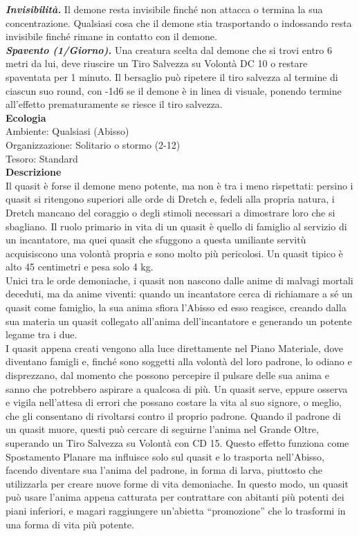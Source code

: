 \begin{multicols}{2}
\emph{\textbf{Invisibilità.}} Il demone resta invisibile finché non attacca o termina la sua concentrazione. Qualsiasi cosa che il demone stia trasportando o indossando resta invisibile finché rimane in contatto con il demone.\\
\emph{\textbf{Spavento (1/Giorno).}} Una creatura scelta dal demone che si trovi entro 6 metri da lui, deve riuscire un Tiro Salvezza su Volontà DC 10 o restare spaventata per 1 minuto. Il bersaglio può ripetere il tiro salvezza al termine di ciascun suo round, con -1d6 se il demone è in linea di visuale, ponendo termine all'effetto prematuramente se riesce il tiro salvezza.\\
\textbf{Ecologia}\\
Ambiente: Qualsiasi (Abisso)\\
Organizzazione: Solitario o stormo (2-12)\\
Tesoro: Standard\\
\textbf{Descrizione}\\
Il quasit è forse il demone meno potente, ma non è tra i meno rispettati: persino i quasit si ritengono superiori alle orde di Dretch e, fedeli alla propria natura, i Dretch mancano del coraggio o degli stimoli necessari a dimostrare loro che si sbagliano. Il ruolo primario in vita di un quasit è quello di famiglio al servizio di un incantatore, ma quei quasit che sfuggono a questa umiliante servitù acquisiscono una volontà propria e sono molto più pericolosi. Un quasit tipico è alto 45 centimetri e pesa solo 4 kg.\\
Unici tra le orde demoniache, i quasit non nascono dalle anime di malvagi mortali deceduti, ma da anime viventi: quando un incantatore cerca di richiamare a sé un quasit come famiglio, la sua anima sfiora l'Abisso ed esso reagisce, creando dalla sua materia un quasit collegato all'anima dell'incantatore e generando un potente legame tra i due.\\
I quasit appena creati vengono alla luce direttamente nel Piano Materiale, dove diventano famigli e, finché sono soggetti alla volontà del loro padrone, lo odiano e disprezzano, dal momento che possono percepire il pulsare delle sua anima e sanno che potrebbero aspirare a qualcosa di più. Un quasit serve, eppure osserva e vigila nell'attesa di errori che possano costare la vita al suo signore, o meglio, che gli consentano di rivoltarsi contro il proprio padrone. Quando il padrone di un quasit muore, questi può cercare di seguirne l'anima nel Grande Oltre, superando un Tiro Salvezza su Volontà con CD 15. Questo effetto funziona come Spostamento Planare ma influisce solo sul quasit e lo trasporta nell'Abisso, facendo diventare sua l'anima del padrone, in forma di larva, piuttosto che utilizzarla per creare nuove forme di vita demoniache. In questo modo, un quasit può usare l'anima appena catturata per contrattare con abitanti più potenti dei piani inferiori, e magari raggiungere un'abietta “promozione” che lo trasformi in una forma di vita più potente.\\

\end{multicols}
